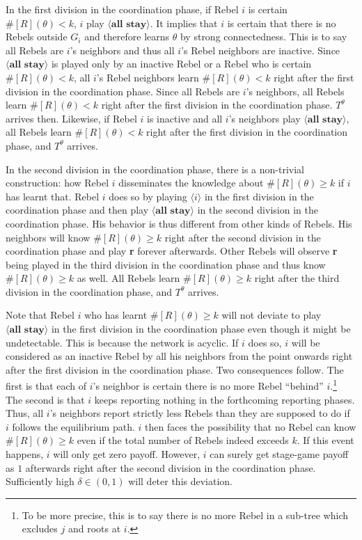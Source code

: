 \documentclass[12pt,letter]{article}
\theoremstyle{definition}
\theoremstyle{remark}
\theoremstyle{claim}
\begin{document}
In the first division in the coordination phase, if Rebel $i$ is certain $\#[R](\theta)<k$, $i$ play $\langle \textbf{all stay} \rangle$. It implies that $i$ is certain that there is no Rebels outside $G_i$ and therefore learns $\theta$ by strong connectedness. This is to say all Rebels are $i$'s neighbors and thus all $i$'s Rebel neighbors are inactive. Since $\langle \textbf{all stay} \rangle$ is played only by an inactive Rebel or a Rebel who is certain $\#[R](\theta)<k$, all $i$'s Rebel neighbors learn $\#[R](\theta)<k$ right after the first division in the coordination phase. Since all Rebels are $i$'s neighbors, all Rebels learn $\#[R](\theta)<k$ right after the first division in the coordination phase. $T^{\theta}$ arrives then. Likewise, if Rebel $i$ is inactive and all $i$'s neighbors play $\langle \textbf{all stay} \rangle$, all Rebels learn $\#[R](\theta)<k$ right after the first division in the coordination phase, and $T^{\theta}$ arrives.    

In the second division in the coordination phase, there is a non-trivial construction: how Rebel $i$ disseminates the knowledge about $\#[R](\theta)\geq k$ if $i$ has learnt that. Rebel $i$ does so by playing $\langle i \rangle$ in the first division in the coordination phase and then play $\langle \textbf{all stay} \rangle$ in the second division in the coordination phase. His behavior is thus different from other kinds of Rebels. His neighbors will know $\#[R](\theta)\geq k$ right after the second division in the coordination phase and play \textbf{r} forever afterwards. Other Rebels will observe \textbf{r} being played in the third division in the coordination phase and thus know $\#[R](\theta)\geq k$ as well. All Rebels learn $\#[R](\theta)\geq k$ right after the third division in the coordination phase, and $T^{\theta}$ arrives.

Note that Rebel $i$ who has learnt $\#[R](\theta)\geq k$ will not deviate to play $\langle \textbf{all stay} \rangle$ in the first division in the coordination phase even though it might be undetectable. This is because the network is acyclic. If $i$ does so, $i$ will be considered as an inactive Rebel by all his neighbors from the point onwards right after the first division in the coordination phase. Two consequences follow. The first is that each of $i$'s neighbor is certain there is no more Rebel ``behind'' $i$.\footnote{To be more precise, this is to say there is no more Rebel in a sub-tree which excludes $j$ and roots at $i$.} 
The second is that $i$ keeps reporting nothing in the forthcoming reporting phases. Thus, all $i$'s neighbors report strictly less Rebels than they are supposed to do if $i$ follows the equilibrium path. $i$ then faces the possibility that no Rebel can know $\#[R](\theta)\geq k$ even if the total number of Rebels indeed exceeds $k$. If this event happens, $i$ will only get zero payoff. However, $i$ can surely get stage-game payoff as $1$ afterwards right after the second division in the coordination phase. Sufficiently high $\delta\in(0,1)$ will deter this deviation. 
\end{document}
